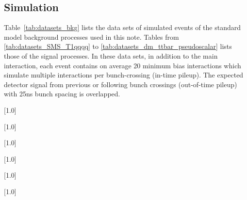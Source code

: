 \subsection{Simulation}

Table~\ref{tab:datasets_bkg} lists the data sets of simulated events of
the standard model background processes used in this note. Tables from
\ref{tab:datasets_SMS_T1qqqq} to
\ref{tab:datasets_dm_ttbar_pseudoscalar} lists those of the signal
processes. In these data sets, in addition to the main interaction, each
event contains on average 20 minimum bias interactions which simulate
multiple interactions per bunch-crossing (in-time pileup). The expected
detector signal from previous or following bunch crossings (out-of-time
pileup) with 25ns bunch spacing is overlapped.

\begin{table}[!h]
 \centering
 \scriptsize
 \scalebox{.7}[1.0]{}
 \label{tab:datasets_bkg}
\end{table}

\begin{table}[!p]
 \centering
 \scriptsize
 \scalebox{.7}[1.0]{}
\label{tab:datasets_SMS_T1qqqq}
\end{table}

\begin{table}[!p]
 \centering
{}
 \scriptsize
 \scalebox{.7}[1.0]{}
\end{table}

\begin{table}[!p]
 \centering
{}
 \scriptsize
 \scalebox{.7}[1.0]{}
\end{table}

\begin{table}[!p]
 \centering
{}
 \scriptsize
 \scalebox{.7}[1.0]{}
\end{table}

\begin{table}[!p]
 \centering
{}
 \tiny
 \scalebox{.7}[1.0]{}
\end{table}

